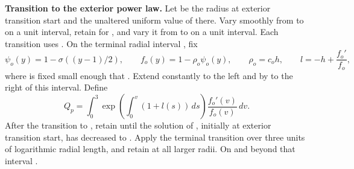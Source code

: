 \noindent\textbf{Transition to the exterior power law.} Let 
be the radius at exterior transition start and  the unaltered
uniform value of  there. Vary  smoothly from
 to  on a unit interval, retain
 for , and vary it from
 to  on a unit interval. Each transition uses
. On the terminal radial interval
, fix
\begin{equation}
\psi_o(y)=1-\sigma((y-1)/2),
\qquad
f_o(y)=1-\rho_o\psi_o(y),
\qquad
\rho_o=c_oh,
\qquad
l=-h+\frac{f_o'}{f_o},
\tag{A.12}\label{eq:A.12}
\end{equation}
where  is fixed small enough that
. Extend  constantly to the
left and by  to the right of this interval. Define
\begin{equation}
Q_p=\int_0^3\exp\left(\int_0^v(1+l(s))\,ds\right)\frac{f_o'(v)}{f_o(v)}\,dv.
\tag{A.13}\label{eq:A.13}
\end{equation}
After the transition to , retain  until the
solution of , initially
 at exterior transition start, has decreased to
. Apply the terminal transition over three units of logarithmic radial
length, and retain  at all larger radii. On and beyond that interval
.

